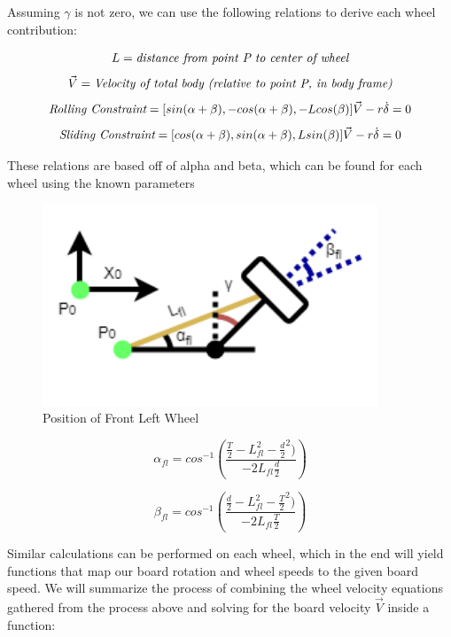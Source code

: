 \documentclass[titlepage, letterpaper,12pt]{article}
\begin{document}
Assuming $\gamma$ is not zero, we can use the following relations to derive each wheel contribution:

\[L = \emph{distance from point P to center of wheel}\]
\[\vec{V} = \emph{Velocity of total body (relative to point P, in body frame)}\]
\begin{equation}
    \emph{Rolling Constraint} =
    [sin(\alpha + \beta), -cos(\alpha + \beta), -Lcos(\beta)]\vec{V} - r\dot{\delta} = 0
\end{equation}
\begin{equation}
    \emph{Sliding Constraint} =
    [cos(\alpha + \beta), sin(\alpha + \beta), Lsin(\beta)]\vec{V} - r\dot{\delta} = 0
\end{equation}

These relations are based off of alpha and beta, which can be found for each wheel using the known parameters

\begin{figure}[!h]
\caption{Position of Front Left Wheel}
\includegraphics[width=10cm]{figs/FL.png}
\centering
\end{figure}

\begin{equation}
    \alpha _{fl} = cos^{-1}(\frac{\frac{T}{2}-L _{fl}^2-\frac{d}{2}^{2})}{-2L _{fl}\frac{d}{2}})
\end{equation}

\begin{equation}
    \beta _{fl} = cos^{-1}(\frac{\frac{d}{2}-L _{fl}^2-\frac{T}{2}^{2})}{-2L _{fl}\frac{T}{2}})
\end{equation}

Similar calculations can be performed on each wheel, which in the end will yield functions that map our board rotation and wheel speeds to the given board speed. We will summarize the process of combining the wheel velocity equations gathered from the process above and solving for the board velocity $\vec{V}$ inside a function:
\end{document}

